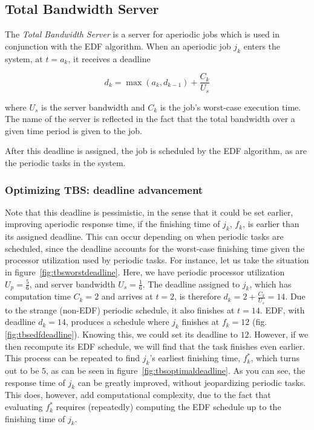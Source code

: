 \documentclass[twoside]{uva-inf-bachelor-thesis}
\begin{document}
\subsection{Total Bandwidth Server}
The \emph{Total Bandwidth Server} is a server for aperiodic jobs which is used in conjunction with the EDF algorithm. When an aperiodic job $j_k$ enters the system, at $t = a_k$, it receives a deadline

\[ d_k = \max(a_k, d_{k-1}) + \frac{C_k}{U_s} \]

where $U_s$ is the server bandwidth and $C_k$ is the job's worst-case execution time. The name of the server is reflected in the fact that the total bandwidth over a given time period is given to the job.

After this deadline is assigned, the job is scheduled by the EDF algorithm, as are the periodic tasks in the system.

\subsubsection{Optimizing TBS: deadline advancement}
Note that this deadline is pessimistic, in the sense that it could be set earlier, improving aperiodic response time, if the finishing time of $j_k$, $f_k$, is earlier than its assigned deadline. This can occur depending on when periodic tasks are scheduled, since the deadline accounts for the worst-case finishing time given the processor utilization used by periodic tasks. For instance, let us take the situation in figure~\ref{fig:tbsworstdeadline}. Here, we have periodic processor utilization $U_p = \frac{5}{6}$, and server bandwidth $U_s = \frac{1}{6}$. The deadline assigned to $j_k$, which has computation time $C_k = 2$ and arrives at $t = 2$, is therefore $d_k = 2 + \frac{C_k}{U_s} = 14$. Due to the strange (non-EDF) periodic schedule, it also finishes at $t = 14$. EDF, with deadline $d_k = 14$, produces a schedule where $j_k$ finishes at $f_k = 12$ (fig. \ref{fig:tbsedfdeadline}). Knowing this, we could set its deadline to $12$. However, if we then recompute its EDF schedule, we will find that the task finishes even earlier. This process can be repeated to find $j_k$'s earliest finishing time, $f^*_k$, which turns out to be $5$, as can be seen in figure~\ref{fig:tbsoptimaldeadline}. As you can see, the response time of $j_k$ can be greatly improved, without jeopardizing periodic tasks. This does, however, add computational complexity, due to the fact that evaluating $f^*_k$ requires (repeatedly) computing the EDF schedule up to the finishing time of $j_k$.
\end{document}
